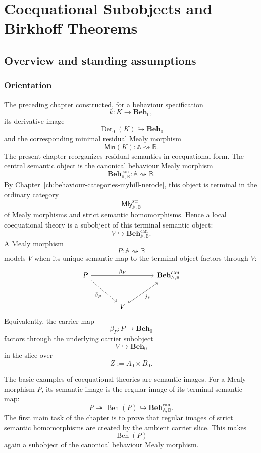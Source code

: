 \chapter{Coequational Subobjects and Birkhoff Theorems}
\label{ch:coequational-subobjects-birkhoff}

\section{Overview and standing assumptions}
\label{sec:coeq-birkhoff-overview}

\subsection{Orientation}
\label{subsec:coeq-birkhoff-orientation}

The preceding chapter constructed, for a behaviour specification
\[
    k:K\to \mathbf{Beh}_0,
\]
its derivative image
\[
    \operatorname{Der}_0(K)\hookrightarrow \mathbf{Beh}_0
\]
and the corresponding minimal residual Mealy morphism
\[
    \mathsf{Min}(K):\mathbb A\rightsquigarrow\mathbb B.
\]
The present chapter reorganizes residual semantics in coequational form. The
central semantic object is the canonical behaviour Mealy morphism
\[
    \mathbf{Beh}^{\mathrm{can}}_{\mathbb A,\mathbb B}:
    \mathbb A\rightsquigarrow\mathbb B.
\]
By Chapter~\ref{ch:behaviour-categories-myhill-nerode}, this object is
terminal in the ordinary category
\[
    \mathsf{Mly}^{\mathrm{str}}_{\mathbb A,\mathbb B}
\]
of Mealy morphisms and strict semantic homomorphisms. Hence a local
coequational theory is a subobject of this terminal semantic object:
\[
    V\hookrightarrow \mathbf{Beh}^{\mathrm{can}}_{\mathbb A,\mathbb B}.
\]
A Mealy morphism
\[
    P:\mathbb A\rightsquigarrow\mathbb B
\]
models \(V\) when its unique semantic map to the terminal object factors
through \(V\):
\[
\begin{tikzcd}[column sep=large, row sep=large]
    P
        \arrow[rr, "\beta_P"]
        \arrow[dr, dashed, "\bar\beta_P"']
    &&
    \mathbf{Beh}^{\mathrm{can}}_{\mathbb A,\mathbb B}
    \\
    &
    V
        \arrow[ur, hook, "j_V"']
    &
\end{tikzcd}
\]
Equivalently, the carrier map
\[
    \beta_P:P\to\mathbf{Beh}_0
\]
factors through the underlying carrier subobject
\[
    V\hookrightarrow\mathbf{Beh}_0
\]
in the slice over
\[
    Z:=A_0\times B_0.
\]

The basic examples of coequational theories are semantic images. For a Mealy
morphism \(P\), its semantic image is the regular image of its terminal
semantic map:
\[
    P\twoheadrightarrow \operatorname{Beh}(P)
    \hookrightarrow \mathbf{Beh}^{\mathrm{can}}_{\mathbb A,\mathbb B}.
\]
The first main task of the chapter is to prove that regular images of strict
semantic homomorphisms are created by the ambient carrier slice. This makes
\[
    \operatorname{Beh}(P)
\]
again a subobject of the canonical behaviour Mealy morphism.

